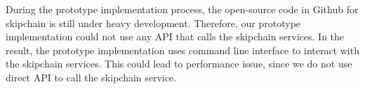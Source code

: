 During the prototype implementation process, the open-source code in Github for skipchain is still under heavy development. Therefore, our prototype implementation could not use any API that calls the skipchain services. In the result, the prototype implementation uses command line interface to interact with the skipchain services. This could lead to performance issue, since we do not use direct API to call the skipchain service.
